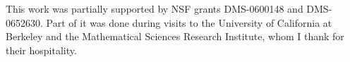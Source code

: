 \documentclass[12pt]{amsart}
\begin{document}
This work was partially supported by NSF grants DMS-0600148 and
DMS-0652630. Part of it was done during visits to the University of
California at Berkeley and the Mathematical Sciences Research
Institute, whom I thank for their hospitality.







\end{document}
